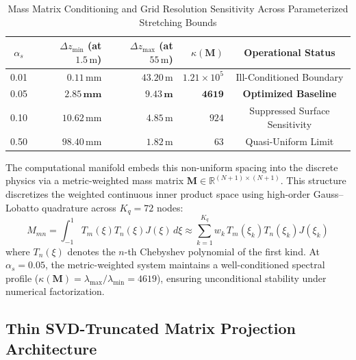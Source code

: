 \documentclass[11pt,a4paper]{article}
\begin{document}
\begin{table}[h]
\centering
\caption{Mass Matrix Conditioning and Grid Resolution Sensitivity Across Parameterized Stretching Bounds}
\label{tab:stretch_sensitivity}
\begin{tabular}{c|rrrc}
\hline
$\alpha_s$ & $\Delta z_{\min}$ (at $1.5\,\text{m}$) & $\Delta z_{\max}$ (at $55\,\text{m}$) & $\kappa(\mathbf{M})$ & Operational Status \\
\hline
0.01 & $0.11\,\text{mm}$ & $43.20\,\text{m}$ & $1.21 \times 10^5$ & Ill-Conditioned Boundary \\
0.05 & $\mathbf{2.85\,\text{mm}}$ & $\mathbf{9.43\,\text{m}}$ & $\mathbf{4619}$ & \textbf{Optimized Baseline} \\
0.10 & $10.62\,\text{mm}$ & $4.85\,\text{m}$ & $924$ & Suppressed Surface Sensitivity \\
0.50 & $98.40\,\text{mm}$ & $1.82\,\text{m}$ & $63$ & Quasi-Uniform Limit \\
\hline
\end{tabular}
\end{table}

The computational manifold embeds this non-uniform spacing into the discrete physics via a metric-weighted mass matrix $\mathbf{M} \in \mathbb{R}^{(N+1) \times (N+1)}$. This structure discretizes the weighted continuous inner product space using high-order Gauss--Lobatto quadrature across $K_q = 72$ nodes:
\begin{equation}
M_{mn} = \int_{-1}^{1} T_m(\xi) T_n(\xi) J(\xi) \, d\xi \approx \sum_{k=1}^{K_q} w_k \, T_m(\xi_k) T_n(\xi_k) J(\xi_k)
\label{eq:mass_matrix_quad}
\end{equation}
where $T_n(\xi)$ denotes the $n$-th Chebyshev polynomial of the first kind. At $\alpha_s = 0.05$, the metric-weighted system maintains a well-conditioned spectral profile ($\kappa(\mathbf{M}) = \lambda_{\max}/\lambda_{\min} = 4619$), ensuring unconditional stability under numerical factorization.

\subsection{Thin SVD-Truncated Matrix Projection Architecture}
\label{sec:methods:svd}
\end{document}
